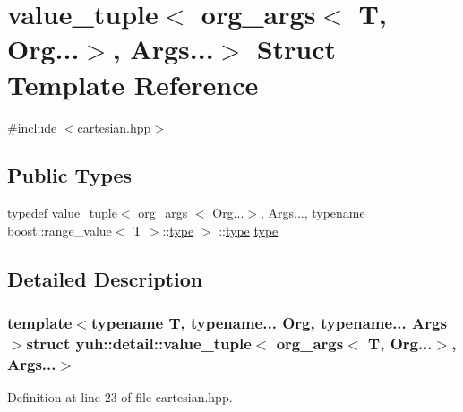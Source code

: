\hypertarget{structyuh_1_1detail_1_1value__tuple_3_01org__args_3_01T_00_01Org_8_8_8_4_00_01Args_8_8_8_4}{\section{value\-\_\-tuple$<$ org\-\_\-args$<$ \-T, \-Org...$>$, \-Args...$>$ \-Struct \-Template \-Reference}
\label{d2/d1d/structyuh_1_1detail_1_1value__tuple_3_01org__args_3_01T_00_01Org_8_8_8_4_00_01Args_8_8_8_4}
}


{\ttfamily \#include $<$cartesian.\-hpp$>$}

\subsection*{\-Public \-Types}
\begin{DoxyCompactItemize}
\item 
typedef \hyperlink{structyuh_1_1detail_1_1value__tuple}{value\-\_\-tuple}$<$ \hyperlink{structyuh_1_1detail_1_1org__args}{org\-\_\-args}\*
$<$ \-Org...$>$, \-Args..., typename \*
boost\-::range\-\_\-value$<$ \-T $>$\-::\hyperlink{structyuh_1_1detail_1_1value__tuple_3_01org__args_3_01T_00_01Org_8_8_8_4_00_01Args_8_8_8_4_a8d31cab27b15186bf2b260a5c85cb7f5}{type} $>$\*
\-::\hyperlink{structyuh_1_1detail_1_1value__tuple_3_01org__args_3_01T_00_01Org_8_8_8_4_00_01Args_8_8_8_4_a8d31cab27b15186bf2b260a5c85cb7f5}{type} \hyperlink{structyuh_1_1detail_1_1value__tuple_3_01org__args_3_01T_00_01Org_8_8_8_4_00_01Args_8_8_8_4_a8d31cab27b15186bf2b260a5c85cb7f5}{type}
\end{DoxyCompactItemize}


\subsection{\-Detailed \-Description}
\subsubsection*{template$<$typename T, typename... \-Org, typename... \-Args$>$struct yuh\-::detail\-::value\-\_\-tuple$<$ org\-\_\-args$<$ T, Org...$>$, Args...$>$}



\-Definition at line 23 of file cartesian.\-hpp.



